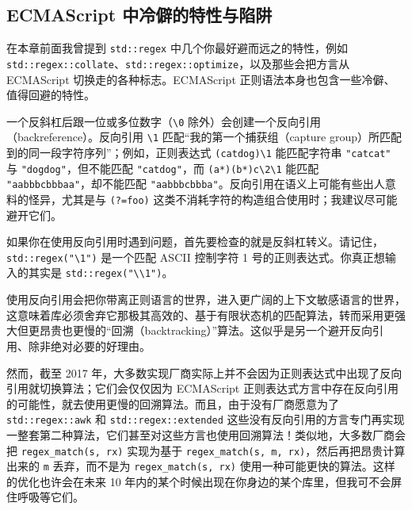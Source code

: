 \subsection{ECMAScript 中冷僻的特性与陷阱}

在本章前面我曾提到 \texttt{std::\allowbreak{}regex} 中几个你最好避而远之的特性，例如 \texttt{std::\allowbreak{}regex::\allowbreak{}collate}、\texttt{std::\allowbreak{}regex::\allowbreak{}optimize}，以及那些会把方言从 ECMAScript 切换走的各种标志。ECMAScript 正则语法本身也包含一些冷僻、值得回避的特性。

一个反斜杠后跟一位或多位数字（\texttt{\textbackslash{}0} 除外）会创建一个反向引用（backreference）。反向引用 \texttt{\textbackslash{}1} 匹配“我的第一个捕获组（capture group）所匹配到的同一段字符序列”；例如，正则表达式 \texttt{(cat\textbar dog)\textbackslash{}1} 能匹配字符串 \texttt{"catcat"} 与 \texttt{"dogdog"}，但不能匹配 \texttt{"catdog"}，而 \texttt{(a*)(b*)c\textbackslash{}2\textbackslash{}1} 能匹配 \texttt{"aabbbcbbbaa"}，却不能匹配 \texttt{"aabbbcbbba"}。反向引用在语义上可能有些出人意料的怪异，尤其是与 \texttt{(\allowbreak{}?=foo)\allowbreak{}} 这类不消耗字符的构造组合使用时；我建议尽可能避开它们。

如果你在使用反向引用时遇到问题，首先要检查的就是反斜杠转义。请记住，\texttt{std::regex("\textbackslash{}1")} 是一个匹配 ASCII 控制字符 1 号的正则表达式。你真正想输入的其实是 \texttt{std::regex("\textbackslash{}\textbackslash{}1")}。

使用反向引用会把你带离正则语言的世界，进入更广阔的上下文敏感语言的世界，这意味着库必须舍弃它那极其高效的、基于有限状态机的匹配算法，转而采用更强大但更昂贵也更慢的“回溯（backtracking）”算法。这似乎是另一个避开反向引用、除非绝对必要的好理由。

然而，截至 2017 年，大多数实现厂商实际上并不会因为正则表达式中出现了反向引用就切换算法；它们会仅仅因为 ECMAScript 正则表达式方言中存在反向引用的可能性，就去使用更慢的回溯算法。而且，由于没有厂商愿意为了 \texttt{std::\allowbreak{}regex::\allowbreak{}awk} 和 \texttt{std::\allowbreak{}regex::\allowbreak{}extended} 这些没有反向引用的方言专门再实现一整套第二种算法，它们甚至对这些方言也使用回溯算法！类似地，大多数厂商会把 \texttt{regex\_\allowbreak{}match(\allowbreak{}s,\allowbreak{} rx)\allowbreak{}} 实现为基于 \texttt{regex\_\allowbreak{}match(\allowbreak{}s,\allowbreak{} m,\allowbreak{} rx)\allowbreak{}}，然后再把昂贵计算出来的 \texttt{m} 丢弃，而不是为 \texttt{regex\_\allowbreak{}match(\allowbreak{}s,\allowbreak{} rx)\allowbreak{}} 使用一种可能更快的算法。这样的优化也许会在未来 10 年内的某个时候出现在你身边的某个库里，但我可不会屏住呼吸等它们。

